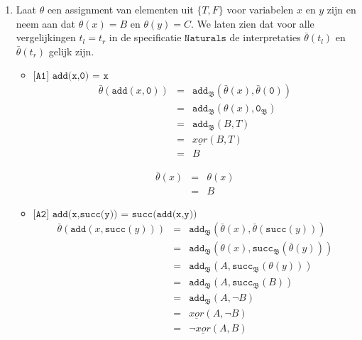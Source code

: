 \documentclass[a4paper,11pt]{article}
\begin{document}
\begin{enumerate}

\item %
Laat $\theta$ een assignment van elementen uit $\{T,F\}$ voor variabelen $x$
en $y$ zijn en neem aan dat $\theta(x) = B$ en $\theta(y) = C$.
We laten zien dat voor alle vergelijkingen $t_{l} = t_{r}$ in de specificatie
$\texttt{Naturals}$ de interpretaties $\bar \theta(t_{l})$ en $\bar
\theta(t_{r})$ gelijk zijn.

\begin{itemize}

\item{$\texttt{[A1] add(x,0) = x}$}
\begin{eqnarray*}
\bar \theta(\texttt{add}(x, \texttt{0})) & = & \texttt{add}_{\mathfrak{B}}(\bar \theta(x), \bar \theta(\texttt{0})) \\
                                         & = & \texttt{add}_{\mathfrak{B}}(\theta(x), \texttt{0}_{\mathfrak{B}}) \\
                                         & = & \texttt{add}_{\mathfrak{B}}(B, T) \\
                                         & = & \underline{xor}(B, T) \\
                                         & = & B
\end{eqnarray*}

\begin{eqnarray*}
\bar \theta(x) & = & \theta(x) \\
               & = & B
\end{eqnarray*}

\item{$\texttt{[A2] add(x,succ(y)) = succ(add(x,y))}$}
\begin{eqnarray*}
\bar \theta(\texttt{add}(x, \texttt{succ}(y))) & = & \texttt{add}_{\mathfrak{B}}(\bar \theta(x), \bar \theta(\texttt{succ}(y))) \\
                                               & = & \texttt{add}_{\mathfrak{B}}(\theta(x), \texttt{succ}_{\mathfrak{B}}(\bar \theta(y))) \\
                                               & = & \texttt{add}_{\mathfrak{B}}(A, \texttt{succ}_{\mathfrak{B}}(\theta(y))) \\
                                               & = & \texttt{add}_{\mathfrak{B}}(A, \texttt{succ}_{\mathfrak{B}}(B)) \\
                                               & = & \texttt{add}_{\mathfrak{B}}(A, \neg B) \\
                                               & = & \underline{xor}(A, \neg B) \\
                                               & = & \neg \underline{xor}(A, B)
\end{eqnarray*}


\end{itemize}
\end{enumerate}
\end{document}
